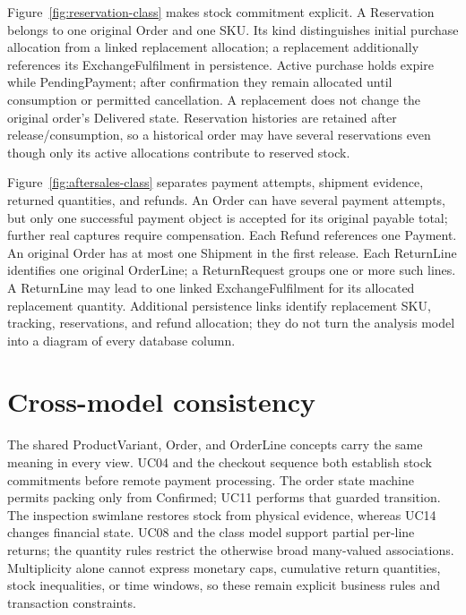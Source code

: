 Figure~\ref{fig:reservation-class} makes stock commitment explicit. A Reservation belongs to one original Order and one SKU. Its kind distinguishes initial purchase allocation from a linked replacement allocation; a replacement additionally references its ExchangeFulfilment in persistence. Active purchase holds expire while PendingPayment; after confirmation they remain allocated until consumption or permitted cancellation. A replacement does not change the original order's Delivered state. Reservation histories are retained after release/consumption, so a historical order may have several reservations even though only its active allocations contribute to reserved stock.

Figure~\ref{fig:aftersales-class} separates payment attempts, shipment evidence, returned quantities, and refunds. An Order can have several payment attempts, but only one successful payment object is accepted for its original payable total; further real captures require compensation. Each Refund references one Payment. An original Order has at most one Shipment in the first release. Each ReturnLine identifies one original OrderLine; a ReturnRequest groups one or more such lines. A ReturnLine may lead to one linked ExchangeFulfilment for its allocated replacement quantity. Additional persistence links identify replacement SKU, tracking, reservations, and refund allocation; they do not turn the analysis model into a diagram of every database column.

\section{Cross-model consistency}
The shared ProductVariant, Order, and OrderLine concepts carry the same meaning in every view. UC04 and the checkout sequence both establish stock commitments before remote payment processing. The order state machine permits packing only from Confirmed; UC11 performs that guarded transition. The inspection swimlane restores stock from physical evidence, whereas UC14 changes financial state. UC08 and the class model support partial per-line returns; the quantity rules restrict the otherwise broad many-valued associations. Multiplicity alone cannot express monetary caps, cumulative return quantities, stock inequalities, or time windows, so these remain explicit business rules and transaction constraints.
